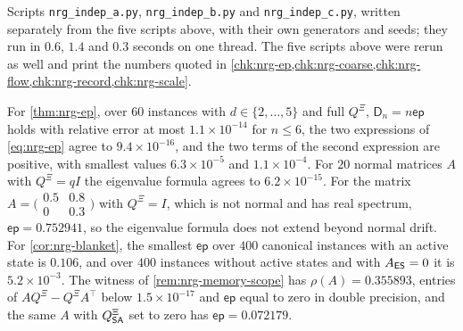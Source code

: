 \begin{numcheck}\label{chk:nrg-indep}
Scripts \texttt{nrg\_\allowbreak indep\_\allowbreak a.py}, \texttt{nrg\_\allowbreak indep\_\allowbreak b.py} and \texttt{nrg\_\allowbreak indep\_\allowbreak c.py}, written separately from the five scripts above, with their own generators and seeds; they run in $0.6$, $1.4$ and $0.3$ seconds on one thread. The five scripts above were rerun as well and print the numbers quoted in \cref{chk:nrg-ep,chk:nrg-coarse,chk:nrg-flow,chk:nrg-record,chk:nrg-scale}.

For \cref{thm:nrg-ep}, over $60$ instances with $d\in\{2,\dots,5\}$ and full $Q^{\Xi}$, $\mathsf D_n=n\mathsf{ep}$ holds with relative error at most $1.1\times10^{-14}$ for $n\le6$, the two expressions of \cref{eq:nrg-ep} agree to $9.4\times10^{-16}$, and the two terms of the second expression are positive, with smallest values $6.3\times10^{-5}$ and $1.1\times10^{-4}$. For $20$ normal matrices $A$ with $Q^{\Xi}=qI$ the eigenvalue formula agrees to $6.2\times10^{-15}$. For the matrix $A=\bigl(\begin{smallmatrix}0.5&0.8\\0&0.3\end{smallmatrix}\bigr)$ with $Q^{\Xi}=I$, which is not normal and has real spectrum, $\mathsf{ep}=0.752941$, so the eigenvalue formula does not extend beyond normal drift. For \cref{cor:nrg-blanket}, the smallest $\mathsf{ep}$ over $400$ canonical instances with an active state is $0.106$, and over $400$ instances without active states and with $A_{\mathsf{E}\mathsf{S}}=0$ it is $5.2\times10^{-3}$. The witness of \cref{rem:nrg-memory-scope} has $\rho(A)=0.355893$, entries of $AQ^{\Xi}-Q^{\Xi}A^\top$ below $1.5\times10^{-17}$ and $\mathsf{ep}$ equal to zero in double precision, and the same $A$ with $Q^{\Xi}_{\mathsf{S}\mathsf{A}}$ set to zero has $\mathsf{ep}=0.072179$.


\end{numcheck}
